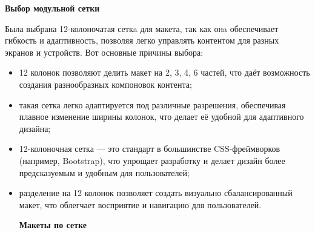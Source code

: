 \textbf{Выбор модульной сетки}

Была выбрана 12-колоночатая сеткa для макета, так как онa обеспечивает гибкость и адаптивность, позволяя легко управлять контентом для разных экранов и устройств. Вот основные причины выбора:
\begin{itemize}
    \item 12 колонок позволяют делить макет на 2, 3, 4, 6 частей, что даёт возможность создания разнообразных компоновок контента;
    \item такая сетка легко адаптируется под различные разрешения, обеспечивая плавное изменение ширины колонок, что делает её удобной для адаптивного дизайна;
    \item 12-колоночная сетка — это стандарт в большинстве CSS-фреймворков (например, Bootstrap), что упрощает разработку и делает дизайн более предсказуемым и удобным для пользователей;
    \item разделение на 12 колонок позволяет создать визуально сбалансированный макет, что облегчает восприятие и навигацию для пользователей.

\textbf{Макеты по сетке}
\bigskip

\noindent
\begin{minipage}{\linewidth}
\end{minipage}
\bigskip


\end{itemize}
